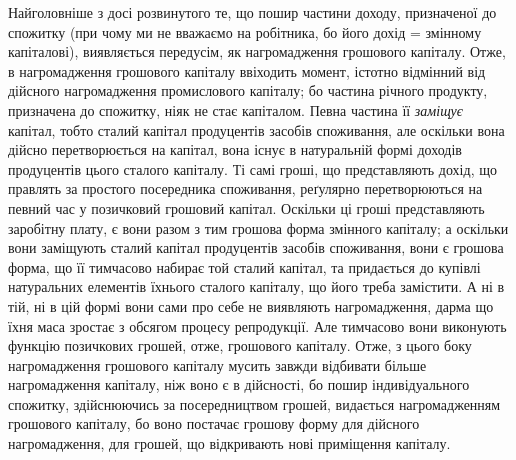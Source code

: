 Найголовніше з досі розвинутого те, що пошир частини доходу, призначеної
до спожитку (при чому ми не вважаємо на робітника, бо його дохід = змінному
капіталові), виявляється передусім, як нагромадження грошового капіталу.
Отже, в нагромадження грошового капіталу ввіходить момент, істотно відмінний
від дійсного нагромадження промислового капіталу; бо частина річного
продукту, призначена до спожитку, ніяк не стає капіталом. Певна частина її
\emph{заміщує} капітал, тобто сталий капітал продуцентів засобів споживання, але
оскільки вона дійсно перетворюється на капітал, вона існує в натуральній формі
доходів продуцентів цього сталого капіталу. Ті самі гроші, що представляють
дохід, що правлять за простого посередника споживання, реґулярно перетворюються
на певний час у позичковий грошовий капітал. Оскільки ці гроші
представляють заробітну плату, є вони разом з тим грошова форма змінного
капіталу; а оскільки вони заміщують сталий капітал продуцентів засобів споживання,
вони є грошова форма, що її тимчасово набирає той сталий капітал,
та придається до купівлі натуральних елементів їхнього сталого капіталу, що його
треба замістити. А ні в тій, ні в цій формі вони сами про себе не виявляють
нагромадження, дарма що їхня маса зростає з обсягом процесу репродукції.
Але тимчасово вони виконують функцію позичкових грошей, отже, грошового
капіталу. Отже, з цього боку нагромадження грошового капіталу мусить
завжди відбивати більше нагромадження капіталу, ніж воно є в дійсності, бо
пошир індивідуального спожитку, здійснюючись за посередництвом грошей, видається
нагромадженням грошового капіталу, бо воно постачає грошову форму для
дійсного нагромадження, для грошей, що відкривають нові приміщення капіталу.
